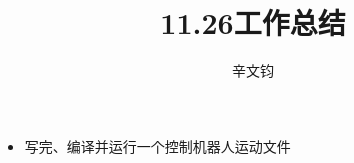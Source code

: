 \documentclass[a4paper]{article}
\title{11.26工作总结}
\author{辛文钧}
\begin{document}
	\maketitle
	\begin{itemize}
		\item 写完、编译并运行一个控制机器人运动文件
	\end{itemize}
\end{document}
